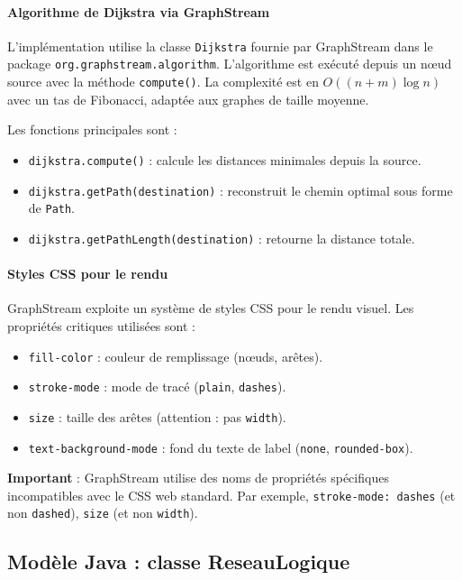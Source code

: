 \documentclass[12pt, a4paper]{article}
\begin{document}
\paragraph{Algorithme de Dijkstra via GraphStream}
L'implémentation utilise la classe \texttt{Dijkstra} fournie par GraphStream dans le package \texttt{org.graphstream.algorithm}. L'algorithme est exécuté depuis un nœud source avec la méthode \texttt{compute()}. La complexité est en $O((n + m) \log n)$ avec un tas de Fibonacci, adaptée aux graphes de taille moyenne.

Les fonctions principales sont :
\begin{itemize}
    \item \texttt{dijkstra.compute()} : calcule les distances minimales depuis la source.
    \item \texttt{dijkstra.getPath(destination)} : reconstruit le chemin optimal sous forme de \texttt{Path}.
    \item \texttt{dijkstra.getPathLength(destination)} : retourne la distance totale.
\end{itemize}

\paragraph{Styles CSS pour le rendu}
GraphStream exploite un système de styles CSS pour le rendu visuel. Les propriétés critiques utilisées sont :
\begin{itemize}
    \item \texttt{fill-color} : couleur de remplissage (nœuds, arêtes).
    \item \texttt{stroke-mode} : mode de tracé (\texttt{plain}, \texttt{dashes}).
    \item \texttt{size} : taille des arêtes (attention : pas \texttt{width}).
    \item \texttt{text-background-mode} : fond du texte de label (\texttt{none}, \texttt{rounded-box}).
\end{itemize}

\textbf{Important} : GraphStream utilise des noms de propriétés spécifiques incompatibles avec le CSS web standard. Par exemple, \texttt{stroke-mode: dashes} (et non \texttt{dashed}), \texttt{size} (et non \texttt{width}).

\subsection{Modèle Java : classe ReseauLogique}
\end{document}
